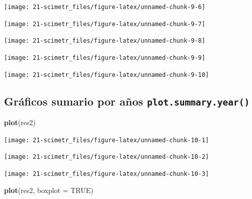 \documentclass[]{book}
\newenvironment{Shaded}{\begin{snugshade}}{\end{snugshade}}
\newcommand{\KeywordTok}[1]{\textcolor[rgb]{0.13,0.29,0.53}{\textbf{#1}}}
\newcommand{\DataTypeTok}[1]{\textcolor[rgb]{0.13,0.29,0.53}{#1}}
\newcommand{\OtherTok}[1]{\textcolor[rgb]{0.56,0.35,0.01}{#1}}
\newcommand{\NormalTok}[1]{#1}
\begin{document}
\begin{flushleft}\texttt{[image: 21-scimetr\_files/figure-latex/unnamed-chunk-9-6]} \end{flushleft}

\begin{flushleft}\texttt{[image: 21-scimetr\_files/figure-latex/unnamed-chunk-9-7]} \end{flushleft}

\begin{flushleft}\texttt{[image: 21-scimetr\_files/figure-latex/unnamed-chunk-9-8]} \end{flushleft}

\begin{flushleft}\texttt{[image: 21-scimetr\_files/figure-latex/unnamed-chunk-9-9]} \end{flushleft}

\begin{flushleft}\texttt{[image: 21-scimetr\_files/figure-latex/unnamed-chunk-9-10]} \end{flushleft}

\subsection{\texorpdfstring{Gráficos sumario por años
\texttt{plot.summary.year()}}{Gráficos sumario por años plot.summary.year()}}\label{graficos-sumario-por-anos-plot.summary.year}

\begin{Shaded}
\begin{Highlighting}[]
\KeywordTok{plot}\NormalTok{(res2)}
\end{Highlighting}
\end{Shaded}

\begin{flushleft}\texttt{[image: 21-scimetr\_files/figure-latex/unnamed-chunk-10-1]} \end{flushleft}

\begin{flushleft}\texttt{[image: 21-scimetr\_files/figure-latex/unnamed-chunk-10-2]} \end{flushleft}

\begin{flushleft}\texttt{[image: 21-scimetr\_files/figure-latex/unnamed-chunk-10-3]} \end{flushleft}

\begin{Shaded}
\begin{Highlighting}[]
\KeywordTok{plot}\NormalTok{(res2, }\DataTypeTok{boxplot =} \OtherTok{TRUE}\NormalTok{)}
\end{Highlighting}
\end{Shaded}
\end{document}
